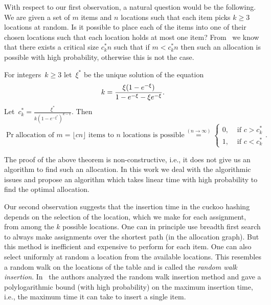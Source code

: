 With respect to our first observation, a natural question would be the following. We are given a set of $m$ items and $n$ locations such that each item picks $k\ge 3$ locations at random. Is it possible to place each of the items into one of their chosen locations such that each location holds at most one item? From~ \cite{inp:l12, fp12,fm12} we know that there exists a critical size $c_k^* n$ such that if $m<c_k^* n$ then such an allocation is possible with high probability, otherwise this is not the case.


\begin{theorem}
\label{thm:mainO}
For integers~$k\geq 3$ let~$\xi^\ast$ be the unique solution of the equation
\begin{equation}\label{eq:kxi}
 k = {\xi(1-e^{-\xi})\over 1-e^{-\xi} -\xi e^{-\xi} }.
\end{equation}
Let~$c_{k}^\ast= \frac{\xi^\ast}{k(1-e^{-\xi^{*}})^{k-1}}$. Then
\begin{equation}
\label{eq:phnmkl}
	\Pr{\text{allocation of $m=\lfloor cn\rfloor$ items to $n$ locations is possible}}
	\stackrel{(n \to \infty)}{=} 
	\begin{cases}
		0, & \text{ if } c > c_{k}^\ast \\
		1, & \text{ if } c < c_{k}^\ast
	\end{cases}.
\end{equation}
\end{theorem}

The proof of the above theorem is non-constructive, i.e., it does not give us an algorithm to find such an allocation. In this work we deal with the algorithmic issues and propose an algorithm which takes linear time with high probability to find the optimal allocation.

Our second observation suggests that the insertion time in the cuckoo hashing depends on the selection of the location, which we make for each assignment, from among the $k$ possible locations. One can in principle use breadth first search to  always make assignments over the shortest path (in the allocation graph). But this method is inefficient and expensive to perform for each item. One can also select uniformly at random a location from the available locations. This resembles a random walk on the locations of the table and is called the \emph{random walk insertion}. In~\cite{art:fps10,art:fmm11} the authors analyzed the random walk insertion method and gave a polylogarithmic bound (with high probability) on the maximum insertion time, i.e., the maximum time it can take to insert a single item.  



